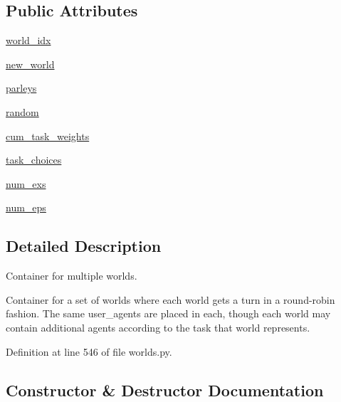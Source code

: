 \subsection*{Public Attributes}
\begin{DoxyCompactItemize}
\item 
\hyperlink{classparlai_1_1core_1_1worlds_1_1MultiWorld_a3d2a0158d96bed4eead1e3b4138d5242}{world\+\_\+idx}
\item 
\hyperlink{classparlai_1_1core_1_1worlds_1_1MultiWorld_ac88454a3fca862db7f00fb165b483dc5}{new\+\_\+world}
\item 
\hyperlink{classparlai_1_1core_1_1worlds_1_1MultiWorld_aa4332cdcbb6a8f91d55fbdeaa412cbe3}{parleys}
\item 
\hyperlink{classparlai_1_1core_1_1worlds_1_1MultiWorld_aa8e5d1fe78cd5ad37c142c95ff2a0a76}{random}
\item 
\hyperlink{classparlai_1_1core_1_1worlds_1_1MultiWorld_aa4264dd13f5d8e7f7883e3afd6d726e7}{cum\+\_\+task\+\_\+weights}
\item 
\hyperlink{classparlai_1_1core_1_1worlds_1_1MultiWorld_af84190b29a206943d32a09e70301a5a2}{task\+\_\+choices}
\item 
\hyperlink{classparlai_1_1core_1_1worlds_1_1MultiWorld_a97cb387aa6641126af73571731042ece}{num\+\_\+exs}
\item 
\hyperlink{classparlai_1_1core_1_1worlds_1_1MultiWorld_a6f874903b97f9bfd44354223ae38679e}{num\+\_\+eps}
\end{DoxyCompactItemize}


\subsection{Detailed Description}
\begin{DoxyVerb}Container for multiple worlds.

Container for a set of worlds where each world gets a turn in a round-robin fashion.
The same user_agents are placed in each, though each world may contain additional
agents according to the task that world represents.
\end{DoxyVerb}
 

Definition at line 546 of file worlds.\+py.



\subsection{Constructor \& Destructor Documentation}
\mbox{\label{classparlai_1_1core_1_1worlds_1_1MultiWorld_aba482213da390b05a216cedb070e28ee}} 
